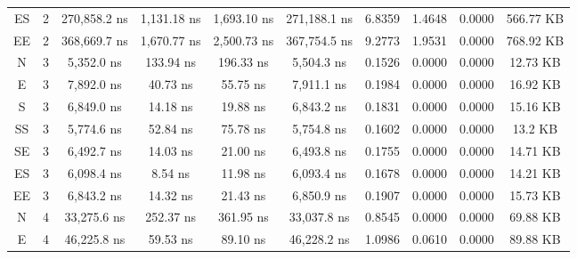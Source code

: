 \begin{sidewaystable}
\begin{tabular}{|c|c|c|c|c|c|c|c|c|c|}
        ES      &   2       &   270,858.2 ns          &   1,131.18 ns       &   1,693.10 ns           &   271,188.1 ns          &   6.8359      &   1.4648      &   0.0000      &   566.77 KB        \\
        EE      &   2       &   368,669.7 ns          &   1,670.77 ns       &   2,500.73 ns           &   367,754.5 ns          &   9.2773      &   1.9531      &   0.0000      &   768.92 KB        \\
        N       &   3       &   5,352.0 ns            &   133.94 ns          &   196.33 ns             &   5,504.3 ns            &   0.1526      &   0.0000      &   0.0000      &   12.73 KB         \\
        E       &   3       &   7,892.0 ns            &   40.73 ns           &   55.75 ns              &   7,911.1 ns            &   0.1984      &   0.0000      &   0.0000      &   16.92 KB         \\
        S       &   3       &   6,849.0 ns            &   14.18 ns           &   19.88 ns              &   6,843.2 ns            &   0.1831      &   0.0000      &   0.0000      &   15.16 KB         \\
        SS      &   3       &   5,774.6 ns            &   52.84 ns           &   75.78 ns              &   5,754.8 ns            &   0.1602      &   0.0000      &   0.0000      &   13.2 KB          \\
        SE      &   3       &   6,492.7 ns            &   14.03 ns           &   21.00 ns              &   6,493.8 ns            &   0.1755      &   0.0000      &   0.0000      &   14.71 KB         \\
        ES      &   3       &   6,098.4 ns            &   8.54 ns            &   11.98 ns              &   6,093.4 ns            &   0.1678      &   0.0000      &   0.0000      &   14.21 KB         \\
        EE      &   3       &   6,843.2 ns            &   14.32 ns           &   21.43 ns              &   6,850.9 ns            &   0.1907      &   0.0000      &   0.0000      &   15.73 KB         \\
        N       &   4       &   33,275.6 ns           &   252.37 ns         &   361.95 ns             &   33,037.8 ns           &   0.8545      &   0.0000      &   0.0000      &   69.88 KB         \\
        E       &   4       &   46,225.8 ns           &   59.53 ns          &   89.10 ns              &   46,228.2 ns           &   1.0986      &   0.0610      &   0.0000      &   89.88 KB         \\

\end{tabular}
\end{sidewaystable}
